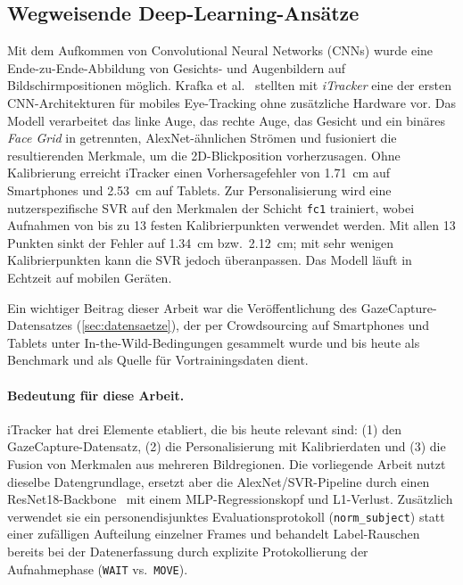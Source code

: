 \documentclass[
  11pt,
  a4paper,
  oneside,
  DIV=12,                 %
  BCOR=8mm,               %
  parskip=half,           %
  headings=normal,
  bibliography=totoc,     %
  listof=totoc            %
]{scrreprt}
\newcommand{\code}[1]{\texttt{#1}}
\begin{document}
\subsection{Wegweisende Deep-Learning-Ansätze}
\label{subsec:dl_pioniere}
Mit dem Aufkommen von Convolutional Neural Networks (CNNs) wurde eine Ende-zu-Ende-Abbildung von Gesichts- und Augenbildern auf Bildschirmpositionen möglich. Krafka et al.~\cite{krafka2016itracker} stellten mit \emph{iTracker} eine der ersten CNN-Architekturen für mobiles Eye-Tracking ohne zusätzliche Hardware vor. Das Modell verarbeitet das linke Auge, das rechte Auge, das Gesicht und ein binäres \emph{Face Grid} in getrennten, AlexNet-ähnlichen Strömen und fusioniert die resultierenden Merkmale, um die 2D-Blickposition vorherzusagen. Ohne Kalibrierung erreicht iTracker einen Vorhersagefehler von \SI{1,71}{\centi\metre} auf Smartphones und \SI{2,53}{\centi\metre} auf Tablets. Zur Personalisierung wird eine nutzerspezifische SVR auf den Merkmalen der Schicht \code{fc1} trainiert, wobei Aufnahmen von bis zu 13 festen Kalibrierpunkten verwendet werden. Mit allen 13 Punkten sinkt der Fehler auf \SI{1,34}{\centi\metre} bzw.\ \SI{2,12}{\centi\metre}; mit sehr wenigen Kalibrierpunkten kann die SVR jedoch überanpassen. Das Modell läuft in Echtzeit auf mobilen Geräten.

Ein wichtiger Beitrag dieser Arbeit war die Veröffentlichung des GazeCapture-Datensatzes (\cref{sec:datensaetze}), der per Crowdsourcing auf Smartphones und Tablets unter In-the-Wild-Bedingungen gesammelt wurde und bis heute als Benchmark und als Quelle für Vortrainingsdaten dient.

\paragraph{Bedeutung für diese Arbeit.}
iTracker hat drei Elemente etabliert, die bis heute relevant sind: (1) den GazeCapture-Datensatz, (2) die Personalisierung mit Kalibrierdaten und (3) die Fusion von Merkmalen aus mehreren Bildregionen. Die vorliegende Arbeit nutzt dieselbe Datengrundlage, ersetzt aber die AlexNet/SVR-Pipeline durch einen ResNet18-Backbone~\cite{he2016resnet} mit einem MLP-Regressionskopf und L1-Verlust. Zusätzlich verwendet sie ein personendisjunktes Evaluationsprotokoll (\code{norm\_subject}) statt einer zufälligen Aufteilung einzelner Frames und behandelt Label-Rauschen bereits bei der Datenerfassung durch explizite Protokollierung der Aufnahmephase (\code{WAIT} vs.\ \code{MOVE}).
\end{document}

